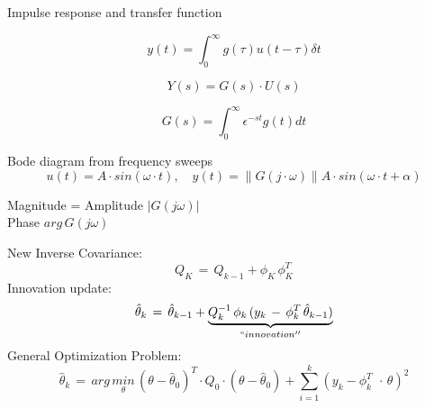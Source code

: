 \begin{tcolorbox}[colback=brown!5!white,colframe=brown!75!black,title=\textbf{Nonparametric and Frequency Domain Identification Models}]
Impulse response and transfer function

\begin{equation*}
y(t)=\int _{ 0 }^{ \infty  }{ g(\tau)u(t-\tau) \delta t } 
\end{equation*}

\begin{equation*}
Y(s)=G(s)\cdot U(s)
\end{equation*}

\begin{equation*}
G(s)=\int _{ 0 }^{ \infty  }{ \epsilon }^{ -st }g(t)dt
\end{equation*}

Bode diagram from frequency sweeps
\begin{equation*}
u(t)=A\cdot sin(\omega \cdot t),\quad y(t)=\parallel G(j\cdot \omega )\parallel A\cdot sin(\omega \cdot t+\alpha )
\end{equation*}
\end{tcolorbox}


\begin{tcolorbox}[colback=brown!5!white,colframe=brown!75!black,title=\textbf{Bode Diagramm}]
Magnitude = Amplitude $|G(j\omega)|$\\
Phase $arg \, G(j\omega)$
\end{tcolorbox}


\begin{tcolorbox}[colback=violet!5!white,colframe=violet!75!black,title=\textbf{Recursive Least Squares}]
New Inverse Covariance:
\begin{equation*}
Q_K \, = \, Q_{k-1} + \phi_K\,\phi_K^T
\end{equation*}
Innovation update:
\begin{equation*}
\hat { \theta  } _{ k }\, =\, \hat { \theta  } _{ k-1 }+\underset { ``innovation'' }{ \underbrace { Q_{ k }^{ -1 }\, \phi _{ k }\, (y_{ k }\, -\, \phi _{ k }^{ T }\, \hat { \theta  } _{ k-1 }) }  } 
\end{equation*}
General Optimization Problem:
\begin{equation*}
\hat { \theta  } _{ k }\, =\, arg\, \underset { \theta  }{ min } \, (\theta -\hat { \theta  } _{ 0 })^{ T }\cdot Q_{ 0 }\cdot (\theta -\hat { \theta  } _{ 0 })+\sum _{ i=1 }^{ k }{ (y_k-\phi_k^T\ \, \cdot \, \theta)^2 } 
\end{equation*}
\end{tcolorbox}

